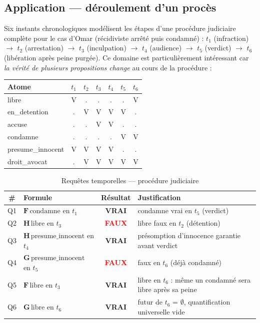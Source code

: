 \subsection{Application --- déroulement d'un procès}

Six instants chronologiques modélisent les étapes d'une procédure judiciaire
complète pour le cas d'Omar (récidiviste arrêté puis condamné) :
$t_1$ (infraction) $\to$ $t_2$ (arrestation) $\to$ $t_3$ (inculpation) $\to$
$t_4$ (audience) $\to$ $t_5$ (verdict) $\to$ $t_6$ (libération après peine
purgée). Ce domaine est particulièrement intéressant car \emph{la vérité de
plusieurs propositions change} au cours de la procédure :

\begin{center}\small
\begin{tabular}{lcccccc}
\toprule
\textbf{Atome} & $t_1$ & $t_2$ & $t_3$ & $t_4$ & $t_5$ & $t_6$ \\
\midrule
libre              & V & . & . & . & . & V \\
en\_detention      & . & V & V & V & V & . \\
accuse             & . & . & V & V & . & . \\
condamne           & . & . & . & . & V & V \\
presume\_innocent  & V & V & V & V & . & . \\
droit\_avocat      & . & V & V & V & V & V \\
\bottomrule
\end{tabular}
\end{center}

\begin{table}[H]
\centering
\caption{Requêtes temporelles --- procédure judiciaire}
\begin{tabularx}{\linewidth}{clcX}
\toprule
\textbf{\#} & \textbf{Formule} & \textbf{Résultat} & \textbf{Justification} \\
\midrule
Q1 & $\mathbf{F}\,\text{condamne}$ en $t_1$
   & \textcolor{codegreen}{\textbf{VRAI}}
   & condamne vrai en $t_5$ (verdict) \\
Q2 & $\mathbf{H}\,\text{libre}$ en $t_3$
   & \textcolor{red}{\textbf{FAUX}}
   & libre faux en $t_2$ (détention) \\
Q3 & $\mathbf{H}\,\text{presume\_innocent}$ en $t_4$
   & \textcolor{codegreen}{\textbf{VRAI}}
   & présomption d'innocence garantie avant verdict \\
Q4 & $\mathbf{G}\,\text{presume\_innocent}$ en $t_5$
   & \textcolor{red}{\textbf{FAUX}}
   & faux en $t_6$ (déjà condamné) \\
Q5 & $\mathbf{F}\,\text{libre}$ en $t_3$
   & \textcolor{codegreen}{\textbf{VRAI}}
   & libre en $t_6$ : même un condamné sera libre après sa peine \\
Q6 & $\mathbf{G}\,\text{libre}$ en $t_6$
   & \textcolor{codegreen}{\textbf{VRAI}}
   & futur de $t_6$ = $\emptyset$, quantification universelle vide \\
\bottomrule
\end{tabularx}
\end{table}

